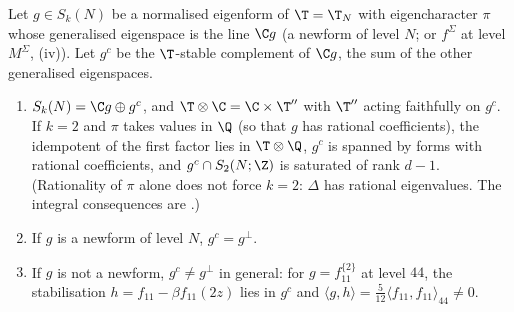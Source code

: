 \begin{proposition}\label{prop:hecke:complements}
Let $g\in S_k(N)$ be a normalised eigenform of $\T=\T_N$ with eigencharacter $\pi$ whose generalised eigenspace is the line $\C g$ (a newform of level $N$; or $f^\Sigma$ at level $M^\Sigma$,
(iv)). Let $g^c$ be the $\T$-stable complement of $\C g$, the sum of the other generalised eigenspaces.
\begin{enumerate}[label=(\roman*)]
\item $S_k(N)=\C g\oplus g^c$, and $\T\otimes\C=\C\times\T''$ with $\T''$ acting faithfully on $g^c$. If $k=2$ and $\pi$ takes values in $\Q$ (so that $g$ has rational coefficients), the idempotent of the
first factor lies in $\T\otimes\Q$, $g^c$ is spanned by forms with rational coefficients, and $g^c\cap S_2(N;\Z)$ is saturated of rank $d-1$. (Rationality of $\pi$ alone does
not force $k=2$: $\Delta$ has rational eigenvalues. The integral consequences are .)
\item If $g$ is a newform of level $N$, $g^c=g^\perp$.
\item If $g$ is not a newform, $g^c\ne g^\perp$ in general: for $g=f_{11}^{\{2\}}$ at level $44$, the stabilisation $h=f_{11}-\beta f_{11}(2z)$ lies in $g^c$ and $\langle g,h\rangle=\frac5{12}\langle f_{11},f_{11}\rangle_{44}\ne0$.
\end{enumerate}
\end{proposition}

